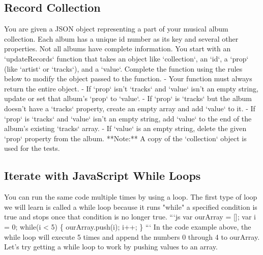 \documentclass{article}%
\begin{document}
\subsection{Record Collection}%
\label{subsec:RecordCollection}%
You are given a JSON object representing a part of your musical album collection. Each album has a unique id number as its key and several other properties. Not all albums have complete information.\newline%
You start with an `updateRecords` function that takes an object like `collection`, an `id`, a `prop` (like `artist` or `tracks`), and a `value`. Complete the function using the rules below to modify the object passed to the function.\newline%
{-} Your function must always return the entire object.\newline%
{-} If `prop` isn't `tracks` and `value` isn't an empty string, update or set that album's `prop` to `value`.\newline%
{-} If `prop` is `tracks` but the album doesn't have a `tracks` property, create an empty array and add `value` to it.\newline%
{-} If `prop` is `tracks` and `value` isn't an empty string, add `value` to the end of the album's existing `tracks` array.\newline%
{-} If `value` is an empty string, delete the given `prop` property from the album.\newline%
**Note:** A copy of the `collection` object is used for the tests.\newline%

%
\subsection{Iterate with JavaScript While Loops}%
\label{subsec:IteratewithJavaScriptWhileLoops}%
You can run the same code multiple times by using a loop.\newline%
The first type of loop we will learn is called a while loop because it runs "while" a specified condition is true and stops once that condition is no longer true.\newline%
```js\newline%
var ourArray = {[}{]};\newline%
var i = 0;\newline%
while(i < 5) \{\newline%
  ourArray.push(i);\newline%
  i++;\newline%
\}\newline%
```\newline%
In the code example above, the while loop will execute 5 times and append the numbers 0 through 4 to ourArray.\newline%
Let's try getting a while loop to work by pushing values to an array.\newline%
\end{document}
